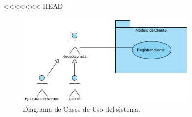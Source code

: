 
<<<<<<< HEAD

\begin{figure}[htbp!]
		\centering
			\includegraphics[width=0.8\textwidth]{images/RegistrarCliente}
		\caption{Diagrama de Casos de Uso del sistema.}
	\end{figure}

